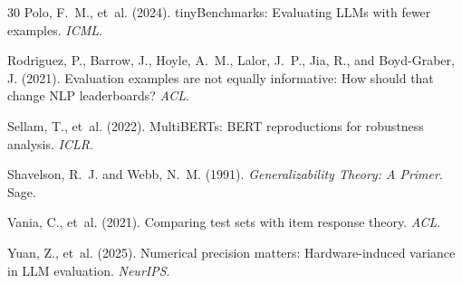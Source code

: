 \documentclass[11pt,twocolumn]{article}
\begin{document}
\begin{thebibliography}{30}
Polo, F.~M., et~al. (2024).
\newblock tinyBenchmarks: Evaluating LLMs with fewer examples.
\newblock \emph{ICML}.

Rodriguez, P., Barrow, J., Hoyle, A.~M., Lalor, J.~P., Jia, R., and Boyd-Graber, J. (2021).
\newblock Evaluation examples are not equally informative: How should that change NLP leaderboards?
\newblock \emph{ACL}.

Sellam, T., et~al. (2022).
\newblock MultiBERTs: BERT reproductions for robustness analysis.
\newblock \emph{ICLR}.

Shavelson, R.~J. and Webb, N.~M. (1991).
\newblock \emph{Generalizability Theory: A Primer}.
\newblock Sage.

Vania, C., et~al. (2021).
\newblock Comparing test sets with item response theory.
\newblock \emph{ACL}.

Yuan, Z., et~al. (2025).
\newblock Numerical precision matters: Hardware-induced variance in LLM evaluation.
\newblock \emph{NeurIPS}.

\end{thebibliography}
\end{document}
